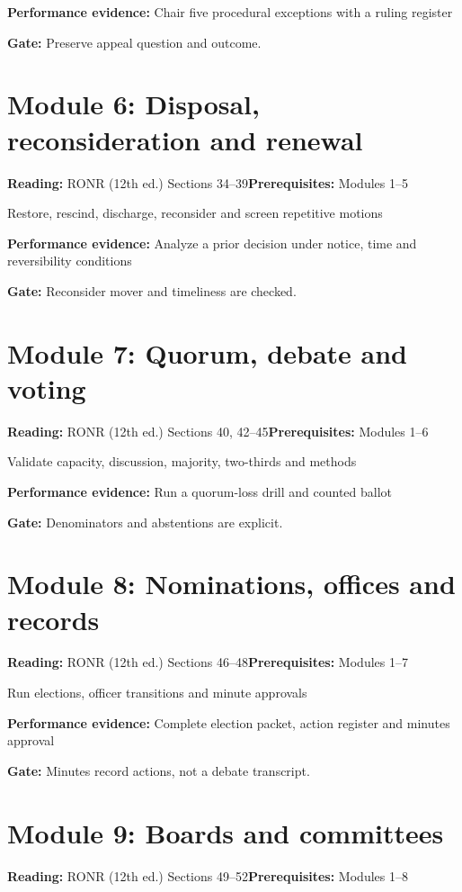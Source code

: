 \documentclass[11pt]{article}
\begin{document}
\textbf{Performance evidence:} Chair five procedural exceptions with a ruling register

\textbf{Gate:} Preserve appeal question and outcome.

\section{Module 6: Disposal, reconsideration and renewal}
\textbf{Reading:} RONR (12th ed.) Sections 34--39\quad\textbf{Prerequisites:} Modules 1--5

Restore, rescind, discharge, reconsider and screen repetitive motions

\textbf{Performance evidence:} Analyze a prior decision under notice, time and reversibility conditions

\textbf{Gate:} Reconsider mover and timeliness are checked.

\section{Module 7: Quorum, debate and voting}
\textbf{Reading:} RONR (12th ed.) Sections 40, 42--45\quad\textbf{Prerequisites:} Modules 1--6

Validate capacity, discussion, majority, two-thirds and methods

\textbf{Performance evidence:} Run a quorum-loss drill and counted ballot

\textbf{Gate:} Denominators and abstentions are explicit.

\section{Module 8: Nominations, offices and records}
\textbf{Reading:} RONR (12th ed.) Sections 46--48\quad\textbf{Prerequisites:} Modules 1--7

Run elections, officer transitions and minute approvals

\textbf{Performance evidence:} Complete election packet, action register and minutes approval

\textbf{Gate:} Minutes record actions, not a debate transcript.

\section{Module 9: Boards and committees}
\textbf{Reading:} RONR (12th ed.) Sections 49--52\quad\textbf{Prerequisites:} Modules 1--8
\end{document}

